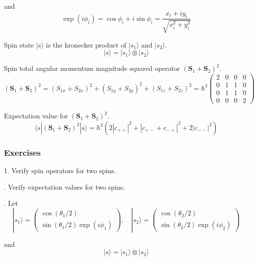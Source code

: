 and
\begin{equation*}
\exp(i\phi_i)=\cos\phi_i+i\sin\phi_i
=\frac{x_i+iy_i}{\sqrt{x_i^2+y_i^2}}
\end{equation*}

Spin state $|s\rangle$ is the kronecker product of $|s_1\rangle$ and $|s_2\rangle$.
\begin{equation*}
|s\rangle=|s_1\rangle\otimes|s_2\rangle
\end{equation*}

Spin total angular momentum magnitude squared operator $(\mathbf S_1+\mathbf S_2)^2$.
\begin{equation*}
(\mathbf S_1+\mathbf S_2)^2
=(S_{1x}+S_{2x})^2+(S_{1y}+S_{2y})^2+(S_{1z}+S_{2z})^2
=\hbar^2\begin{pmatrix}
2&0&0&0\\
0&1&1&0\\
0&1&1&0\\
0&0&0&2
\end{pmatrix}
\end{equation*}

Expectation value for $(\mathbf S_1+\mathbf S_2)^2$.
\begin{equation*}
\langle s|(\mathbf S_1+\mathbf S_2)^2|s\rangle
=\hbar^2\left(2|c_{++}|^2+|c_{+-}+c_{-+}|^2+2|c_{--}|^2\right)
\end{equation*}

\subsubsection*{Exercises}

1. Verify spin operators for two spins.

. Verify expectation values for two spins.

. Let
\begin{equation*}
|s_1\rangle=\begin{pmatrix}\cos(\theta_1/2)\\\sin(\theta_1/2)\exp(i\phi_1)\end{pmatrix},\quad
|s_2\rangle=\begin{pmatrix}\cos(\theta_2/2)\\\sin(\theta_2/2)\exp(i\phi_2)\end{pmatrix}
\end{equation*}

and
\begin{equation*}
|s\rangle=|s_1\rangle\otimes|s_2\rangle
\end{equation*}

